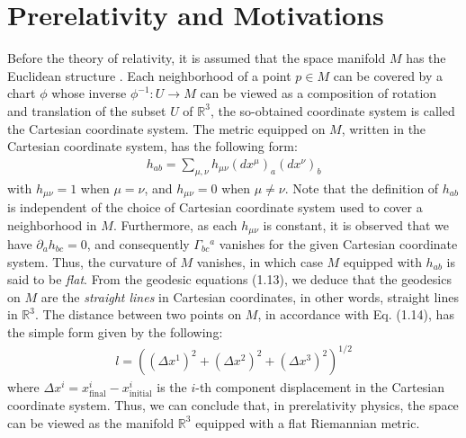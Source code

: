 \documentclass[11pt, onesided]{book}
\theoremstyle{break}
\theoremstyle{break}
\newcommand{\R}{\mathbb{R}}
\newcommand{\pd}{\partial}
\begin{document}

\section[Prerelativity and Motivations]{\color{red}Prerelativity and Motivations\color{black}}
Before the theory of relativity, it is assumed that the space manifold $M$ has the Euclidean structure . Each neighborhood of a point $p \in M$ can be covered by a chart $\phi$ whose inverse $\phi^{-1}: U\to M$ can be viewed as a composition of rotation and translation of the subset $U$ of $\R^3$, the so-obtained coordinate system is called the Cartesian coordinate system. The metric equipped on $M$, written in the Cartesian coordinate system, has the following form:
\begin{align}
h_{ab} = \sum_{\mu,\nu}h_{\mu \nu}(dx^\mu)_a (dx^\nu)_b
\end{align}
with $h_{\mu\nu} =1$ when $\mu=\nu$, and $h_{\mu\nu}=0$ when $\mu\neq \nu$. Note that the definition of $h_{ab}$ is independent of the choice of Cartesian coordinate system used to cover a neighborhood in $M$. Furthermore, as each $h_{\mu\nu}$ is constant, it is observed that we have $\pd_a h_{bc} = 0$, and consequently $\Gamma_{bc}{}^a$ vanishes for the given Cartesian coordinate system. Thus, the curvature of $M$ vanishes, in which case $M$ equipped with $h_{ab}$ is said to be \textit{flat}. From the geodesic equations (1.13), we deduce that the geodesics on $M$ are the \textit{straight lines} in Cartesian coordinates, in other words, straight lines in $\R^3$. The distance between two points on $M$, in accordance with Eq. (1.14), has the simple form given by the following:
\begin{align*}
l = \left((\Delta x^1)^2+(\Delta x^2)^2+(\Delta x^3)^2\right)^{1/2}
\end{align*}
where $\Delta x^i = x^i_{\text{final}} - x^i_{\text{initial}}$ is the $i$-th component displacement in the Cartesian coordinate system. Thus, we can conclude that, in prerelativity physics, the space can be viewed as the manifold $\R^3$ equipped with a flat Riemannian metric. \\
\end{document}

